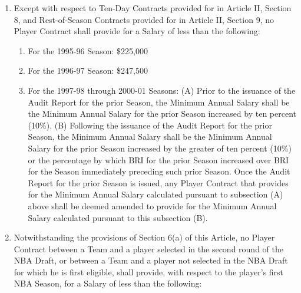 \documentclass[
]{book}
\providecommand{\tightlist}{%
  \setlength{\itemsep}{0pt}\setlength{\parskip}{0pt}}
\begin{document}
\begin{enumerate}
\def\labelenumi{(\alph{enumi})}
\tightlist
\item
  Except with respect to Ten-Day Contracts provided for in Article II, Section 8, and Rest-of-Season Contracts provided for in Article II, Section 9, no Player Contract shall provide for a Salary of less than the following:

  \begin{enumerate}
  \def\labelenumii{(\roman{enumii})}
  \tightlist
  \item
    For the 1995-96 Season: \$225,000
  \item
    For the 1996-97 Season: \$247,500
  \item
    For the 1997-98 through 2000-01 Seasons:
    (A) Prior to the issuance of the Audit Report for the prior Season, the Minimum Annual Salary shall be the Minimum Annual Salary for the prior Season increased by ten percent (10\%).
    (B) Following the issuance of the Audit Report for the prior Season, the Minimum Annual Salary shall be the Minimum Annual Salary for the prior Season increased by the greater of ten percent (10\%) or the percentage by which BRI for the prior Season increased over BRI for the Season immediately preceding such prior Season. Once the Audit Report for the prior Season is issued, any Player Contract that provides for the Minimum Annual Salary calculated pursuant to subsection (A) above shall be deemed amended to provide for the Minimum Annual Salary calculated pursuant to this subsection (B).
  \end{enumerate}
\item
  Notwithstanding the provisions of Section 6(a) of this Article, no Player Contract between a Team and a player selected in the second round of the NBA Draft, or between a Team and a player not selected in the NBA Draft for which he is first eligible, shall provide, with respect to the player's first NBA Season, for a Salary of less than the following:


\end{enumerate}
\end{document}
